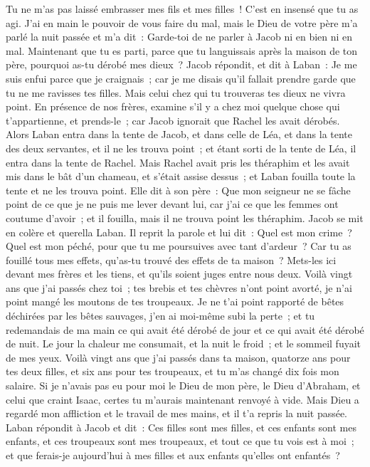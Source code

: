 \begin{multicols}{2}
Tu ne m'as pas laissé embrasser mes fils et mes filles~! C'est en insensé que tu as agi.
J'ai en main le pouvoir de vous faire du mal, mais le Dieu de votre père m'a parlé la nuit passée et m'a dit~: Garde-toi de ne parler à Jacob ni en bien ni en mal.
Maintenant que tu es parti, parce que tu languissais après la maison de ton père, pourquoi as-tu dérobé mes dieux~?
Jacob répondit, et dit à Laban~: Je me suis enfui parce que je craignais~; car je me disais qu'il fallait prendre garde que tu ne me ravisses tes filles.
Mais celui chez qui tu trouveras tes dieux ne vivra point. En présence de nos frères, examine s'il y a chez moi quelque chose qui t'appartienne, et prends-le~; car Jacob ignorait que Rachel les avait dérobés.
Alors Laban entra dans la tente de Jacob, et dans celle de Léa, et dans la tente des deux servantes, et il ne les trouva point~; et étant sorti de la tente de Léa, il entra dans la tente de Rachel.
Mais Rachel avait pris les théraphim et les avait mis dans le bât d'un chameau, et s'était assise dessus~; et Laban fouilla toute la tente et ne les trouva point.
Elle dit à son père~: Que mon seigneur ne se fâche point de ce que je ne puis me lever devant lui, car j'ai ce que les femmes ont coutume d'avoir~; et il fouilla, mais il ne trouva point les théraphim.
Jacob se mit en colère et querella Laban. Il reprit la parole et lui dit~: Quel est mon crime~? Quel est mon péché, pour que tu me poursuives avec tant d'ardeur~?
Car tu as fouillé tous mes effets, qu'as-tu trouvé des effets de ta maison~? Mets-les ici devant mes frères et les tiens, et qu'ils soient juges entre nous deux.
Voilà vingt ans que j'ai passés chez toi~; tes brebis et tes chèvres n'ont point avorté, je n'ai point mangé les moutons de tes troupeaux.
Je ne t'ai point rapporté de bêtes déchirées par les bêtes sauvages, j'en ai moi-même subi la perte~; et tu redemandais de ma main ce qui avait été dérobé de jour et ce qui avait été dérobé de nuit.
Le jour la chaleur me consumait, et la nuit le froid~; et le sommeil fuyait de mes yeux.
Voilà vingt ans que j'ai passés dans ta maison, quatorze ans pour tes deux filles, et six ans pour tes troupeaux, et tu m'as changé dix fois mon salaire.
Si je n'avais pas eu pour moi le Dieu de mon père, le Dieu d'Abraham, et celui que craint Isaac, certes tu m'aurais maintenant renvoyé à vide. Mais Dieu a regardé mon affliction et le travail de mes mains, et il t'a repris la nuit passée.
Laban répondit à Jacob et dit~: Ces filles sont mes filles, et ces enfants sont mes enfants, et ces troupeaux sont mes troupeaux, et tout ce que tu vois est à moi~; et que ferais-je aujourd'hui à mes filles et aux enfants qu'elles ont enfantés~?

\end{multicols}

